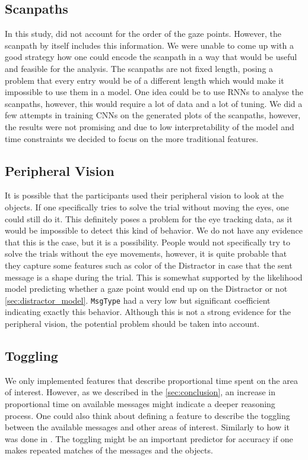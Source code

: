 \subsection{Scanpaths}
\label{sec:general-discussion:scanpaths}
In this study, did not account for  the order of the gaze points. However, the scanpath by itself includes this information. We were unable to come up with a good strategy how one could encode the scanpath in a way that would be useful and feasible for the analysis. The scanpaths are not fixed length, posing a problem that every entry would be of a different length which would make it impossible to use them in a model. One idea could be to use RNNs to analyse the scanpaths, however, this would require a lot of data and a lot of tuning. We did a few attempts in training CNNs on the generated plots of the scanpaths, however, the results were not promising and due to low interpretability of the model and time constraints we decided to focus on the more traditional features.

\subsection{Peripheral Vision}
\label{sec:general-discussion:attention-and-eye-tracking}
It is possible that the participants used their peripheral vision to look at the objects. If one specifically tries to solve the trial without moving the eyes, one could still do it. This definitely poses a problem for the eye tracking data, as it would be impossible to detect this kind of behavior. We do not have any evidence that this is the case, but it is a possibility. People would not specifically try to solve the trials without the eye movements, however, it is quite probable that they capture some features such as color of the Distractor in case that the sent message is a shape during the trial. This is somewhat supported by the likelihood model predicting whether a gaze point would end up on the Distractor or not \autoref{sec:distractor_model}. \texttt{MsgType} had a very low but significant coefficient indicating exactly this behavior. Although this is not a strong evidence for the peripheral vision, the potential problem should be taken into account.


\subsection{Toggling}
\label{sec:general-discussion:toggling}
We only implemented features that describe proportional time spent on the area of interest. However, as we described in the \autoref{sec:conclusion}, an increase in proportional time on available messages might indicate a deeper reasoning process. One could also think about defining a feature to describe the toggling between the available messages and other areas of interest. Similarly to how it was done in \cite{Vigneau_2006}. The toggling might be an important predictor for accuracy if one makes repeated matches of the messages and the objects. 

